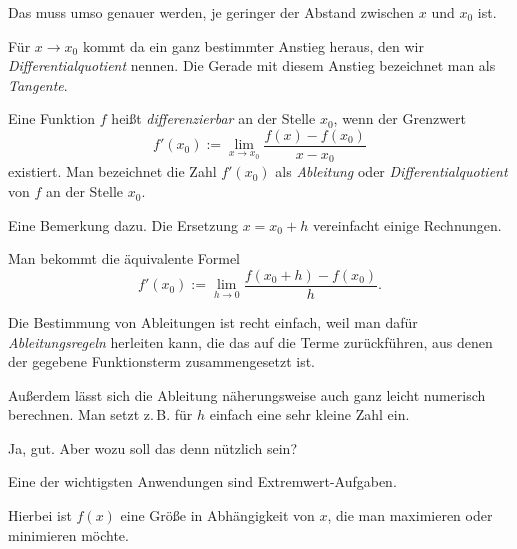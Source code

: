 \documentclass{beamer}
\begin{document}
\begin{frame}
Das muss umso genauer werden, je geringer der Abstand zwischen
$x$ und $x_0$ ist.\pause

\vspace{0.8em}
Für $x\to x_0$ kommt da ein ganz bestimmter Anstieg heraus, den
wir \emph{Differentialquotient} nennen. Die Gerade mit diesem
Anstieg bezeichnet man als \emph{Tangente}.
\end{frame}

\begin{frame}
\begin{Definition}
Eine Funktion $f$ heißt \emph{differenzierbar}
an der Stelle $x_0$, wenn der Grenzwert
\[f'(x_0) := \lim_{x\to x_0}\frac{f(x)-f(x_0)}{x-x_0}\]
existiert. Man bezeichnet die Zahl $f'(x_0)$ als \emph{Ableitung} oder
\emph{Differentialquotient} von $f$ an der Stelle $x_0$.
\end{Definition}
\end{frame}

\begin{frame}
Eine Bemerkung dazu. Die Ersetzung $x=x_0+h$ vereinfacht einige
Rechnungen.\pause

\vspace{0.8em}
Man bekommt die äquivalente Formel
\[f'(x_0) := \lim_{h\to 0} \frac{f(x_0+h)-f(x_0)}{h}.\]
\end{frame}

\begin{frame}
Die Bestimmung von Ableitungen ist recht einfach, weil man dafür
\emph{Ableitungsregeln} herleiten kann, die das auf die Terme
zurückführen, aus denen der gegebene Funktionsterm
zusammengesetzt ist.\pause

\vspace{0.8em}
Außerdem lässt sich die Ableitung näherungsweise auch ganz leicht
numerisch berechnen. Man setzt z.\,B. für $h$ einfach eine sehr
kleine Zahl ein.
\end{frame}

\begin{frame}
Ja, gut. Aber wozu soll das denn nützlich sein?
\end{frame}

\begin{frame}
Eine der wichtigsten Anwendungen sind Extremwert-Aufgaben.\pause

\vspace{0.8em}
Hierbei ist $f(x)$ eine Größe in Abhängigkeit von $x$, die
man maximieren oder minimieren möchte.
\end{frame}
\end{document}
